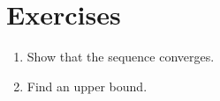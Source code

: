 \section{Exercises}

\begin{enumerate}
\item\label{ex:converge} Show that the sequence converges.
\item\label{ex:bound} Find an upper bound.
\end{enumerate}

